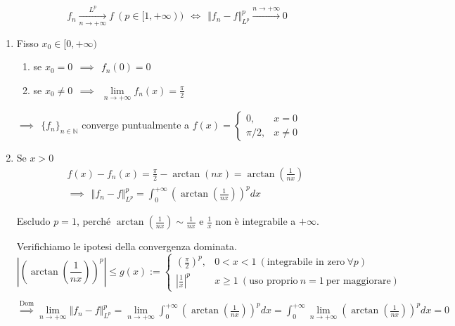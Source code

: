 \Soluzione
\begin{defn}
\begin{equation*}
f_{n}\xrightarrow[n\rightarrow +\infty ]{L^{p}} f\ ( p\in [ 1,+\infty )) \ \ \iff \ \ \Vert f_{n} -f\Vert ^{p}_{L^{p}}\xrightarrow{n\rightarrow +\infty } 0
\end{equation*}
\end{defn}
\begin{enumerate}
\item Fisso $x_{0} \in [ 0,+\infty )$
\begin{enumerate}
\item se $x_{0} =0\ \ \implies \ \ f_{n}( 0) =0$
\item se $x_{0} \neq 0\ \ \implies \ \ \lim\limits _{n\rightarrow +\infty } f_{n}( x) =\frac{\pi }{2}$
\end{enumerate}

$\implies \ \ \{f_{n}\}_{n\in \mathbb{N}}$ converge puntualmente a $f( x) =\begin{cases}
0, & x=0\\
\pi /2, & x\neq 0
\end{cases}$

\item Se $x >0$\begin{gather*}
f( x) -f_{n}( x) =\frac{\pi }{2} -\arctan( nx) =\arctan\left(\frac{1}{nx}\right)\\
\implies \ \ \Vert f_{n} -f\Vert ^{p}_{L^{p}} =\int ^{+\infty }_{0}\left(\arctan\left(\frac{1}{nx}\right)\right)^{p} dx
\end{gather*}

Escludo $p=1$, perché $\arctan\left(\frac{1}{nx}\right) \sim \frac{1}{nx}$ e $\frac{1}{x}$ non è integrabile a $+\infty $.

Verifichiamo le ipotesi della convergenza dominata.\begin{equation*}
\left| \left(\arctan\left(\frac{1}{nx}\right)\right)^{p}\right| \leqslant g( x) :=\begin{cases}
\left(\frac{\pi }{2}\right)^{p} , & 0< x< 1\ \left(\text{integrabile in zero} \ \forall p\right)\\
\left| \frac{1}{x}\right| ^{p} & x\geqslant 1\ \left(\text{uso proprio} \ n=1\ \text{per maggiorare}\right)
\end{cases}
\end{equation*}

$\overset{\text{Dom}}{\implies }\lim\limits _{n\rightarrow +\infty }\Vert f_{n} -f\Vert ^{p}_{L^{p}} =\lim\limits _{n\rightarrow +\infty }\int ^{+\infty }_{0}\left(\arctan\left(\frac{1}{nx}\right)\right)^{p} dx=\int ^{+\infty }_{0}\lim\limits _{n\rightarrow +\infty }\left(\arctan\left(\frac{1}{nx}\right)\right)^{p} dx=0$
\end{enumerate}
